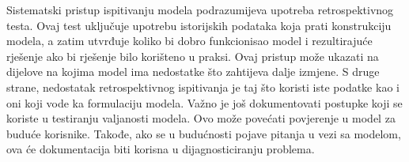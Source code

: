 \documentclass[a4paper, utf8, 11pt, colorlinks]{book}
\begin{document}
  Sistematski pristup ispitivanju modela podrazumijeva upotreba retrospektivnog testa. Ovaj test uključuje upotrebu istorijskih podataka koja prati konstrukciju modela, a zatim utvrđuje koliko bi dobro funkcionisao model i rezultirajuće rješenje 
ako bi rješenje bilo korišteno u praksi.  Ovaj pristup može ukazati na dijelove na kojima model ima nedostatke što zahtijeva dalje izmjene. 
S druge strane, nedostatak retrospektivnog ispitivanja je taj što koristi iste podatke kao i oni koji vode ka formulaciju modela. %
  Važno je još dokumentovati postupke koji se koriste u testiranju valjanosti modela. Ovo može  povećati povjerenje u model za buduće korisnike. Takođe, ako se u budućnosti pojave pitanja u vezi sa modelom, ova će dokumentacija biti korisna u dijagnosticiranju problema. 

\end{document}
